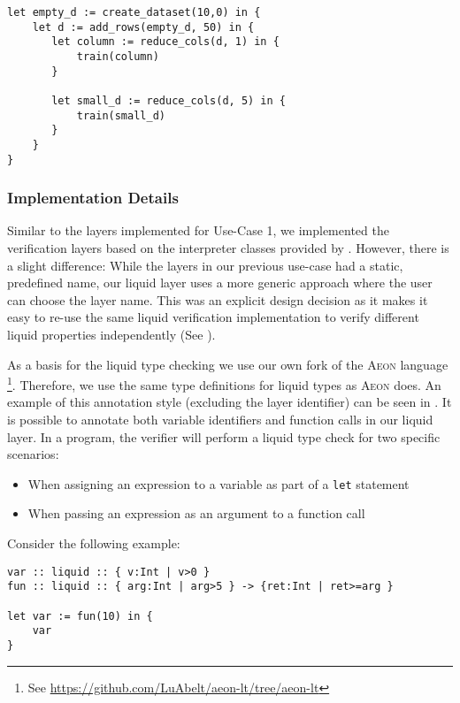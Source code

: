 \begin{center}
\begin{minipage}{0.5\textwidth}
\begin{lstlisting}[caption={Caption that uses both rows and columns},label={lst:uc2_code3}]
let empty_d := create_dataset(10,0) in {
    let d := add_rows(empty_d, 50) in {
       let column := reduce_cols(d, 1) in {
           train(column)
       }

       let small_d := reduce_cols(d, 5) in {
           train(small_d)
       }
    }
}		
\end{lstlisting}
\end{minipage}
\end{center}
\subsubsection{Implementation Details}
\label{sssec:uc2_implementation}

Similar to the layers implemented for Use-Case 1, we implemented the verification layers based on the interpreter classes provided by \Lark. However, there is a slight difference: While the layers in our previous use-case had a static, predefined name, our liquid layer uses a more generic approach where the user can choose the layer name. This was an explicit design decision as it makes it easy to re-use the same liquid verification implementation to verify different liquid properties independently (See ).

As a basis for the liquid type checking we use our own fork of the \textsc{Aeon} language \footnote{See \url{https://github.com/LuAbelt/aeon-lt/tree/aeon-lt}}. Therefore, we use the same type definitions for liquid types as \textsc{Aeon} does. An example of this annotation style (excluding the layer identifier) can be seen in . It is possible to annotate both variable identifiers and function calls in our liquid layer. In a program, the verifier will perform a liquid type check for two specific scenarios:
\begin{itemize}
	\item When assigning an expression to a variable as part of a \texttt{let} statement
	\item When passing an expression as an argument to a function call
\end{itemize}

Consider the following example:

\begin{lstlisting}[caption={Simple example code of a liquid layer},label={lst:uc2_simple_example}]
var :: liquid :: { v:Int | v>0 }
fun :: liquid :: { arg:Int | arg>5 } -> {ret:Int | ret>=arg }

let var := fun(10) in {
	var
}
\end{lstlisting}

